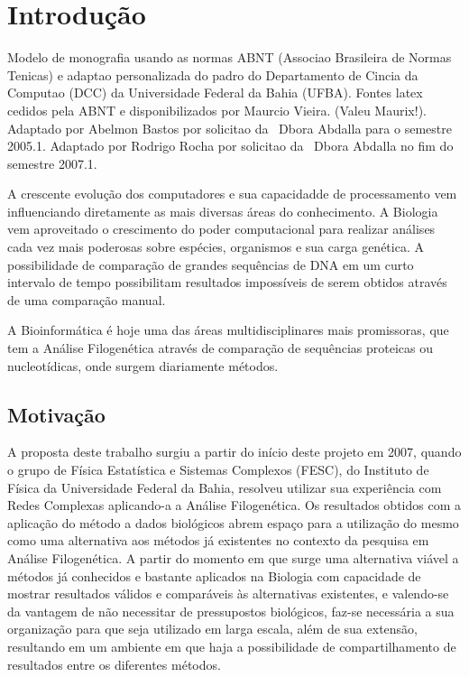 \chapter{Introdução}

Modelo de monografia usando as normas ABNT (Associao Brasileira de Normas
Tenicas) 
e adaptao personalizada 
do padro do Departamento de Cincia da Computao (DCC) da Universidade
Federal da Bahia (UFBA).
Fontes latex cedidos pela ABNT e disponibilizados por 
Maurcio Vieira. (Valeu Maurix!). Adaptado por Abelmon Bastos por solicitao
da \profa\ Dbora Abdalla para o semestre 2005.1.
Adaptado por Rodrigo Rocha por solicitao da \profa\ Dbora Abdalla no fim
do semestre 2007.1.

A crescente evolução dos computadores e sua capacidadde de processamento vem influenciando diretamente as mais diversas áreas do conhecimento. A Biologia
vem aproveitado o crescimento do poder computacional para realizar análises cada vez mais poderosas sobre espécies, organismos e sua carga genética.
A possibilidade de comparação de grandes sequências de DNA em um curto intervalo de tempo possibilitam resultados impossíveis de serem obtidos através
de uma comparação manual.

A Bioinformática é hoje uma das áreas multidisciplinares mais promissoras, que tem a Análise Filogenética através de comparação de sequências proteicas ou
nucleotídicas, onde surgem diariamente métodos.

\section{Motivação}

A proposta deste trabalho surgiu a partir do início deste projeto em 2007, quando o grupo de Física Estatística e Sistemas Complexos (FESC),
do Instituto de Física da Universidade Federal da Bahia, resolveu utilizar sua experiência com Redes Complexas aplicando-a a Análise Filogenética.
Os resultados obtidos com a aplicação do método a dados biológicos abrem espaço para a utilização do mesmo como uma alternativa aos métodos
já existentes no contexto da pesquisa em Análise Filogenética. A partir do momento em que surge uma alternativa viável a métodos já conhecidos
e bastante aplicados na Biologia com capacidade de mostrar resultados válidos e comparáveis às alternativas existentes, e valendo-se da vantagem
de não necessitar de pressupostos biológicos, faz-se necessária a sua organização para que seja utilizado em larga escala, além de sua extensão,
resultando em um ambiente em que haja a possibilidade de compartilhamento de resultados entre os diferentes métodos.

